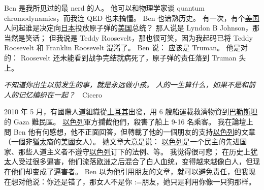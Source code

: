 \documentclass[12pt]{report}
\makeatletter
\newcommand{\cc}[2]{#1}
\newcommand{\cc}[2]{#2}
\newcommand{\tab}{\hspace*{1cm}}
\newcommand{\speechCn}[1]{\textrm{\textit{\textcolor{Speech}{#1}}}}
\renewcommand{\d}[1]{$\underaccent{\scalebox{0.5}{\textbullet}}{\textrm{#1}}$}
\newcommand{\ds}[1]{%
  \@tfor\next:=#1\do{\d{\next}}}
\newcommand*\dashh{\,\,\textemdash\kern-1pt\textemdash\,\,}
\makeatother
\begin{document}
{{}

\cc{
Ben 是我所见过的最 nerd 的人。 他可以和物理学家谈 quantum chromodynamics，而我连 QED 也未搞懂。 Ben 也谙熟历史。  有一次，有个\uline{美国}人问起谁是决定向\uline{日本}投放原子弹的\uline{美国}总统？  那人说是 Lyndon B Johnson，那当然是笑话； 但我说是  Teddy Roosevelt，那也很可笑，因为我起码已将 Teddy Roosevelt 和 Franklin Roosevelt 混淆了。 Ben 说： 应该是 Truman。  他是对的： Roosevelt 还未能看到战争完结就病死了，原子弹的责任落到 Truman 头上。
}{
	
}

\cc{
\speechCn{不知道你出生以前发生的事，就是永远做小孩。 人的一生算什么，如果不是和前人的记忆编织在一起？} \tab \dashh Cicero
}{
	
}

\cc{
2010 年 5 月，有國際人道組織從\uline{土耳其}出發，用 6 艘船運載救濟物資到\uline{巴勒斯坦}的 Gaza 難民區。 \uline{以色列}軍方攔截他們，殺害了船上 9-16 名乘客。 我在論壇上問 Ben 他有何感想，他不正面回答，但轉載了他的一個朋友的支持\uline{以色列}的文章（一個非\uline{猶太}裔的\uline{美國}女人）。 她文章大意是说： \uline{以色列}是一个民主的先进国家、那些人道主义者不遵守\uline{以色列}订下的法例、等。 我觉得很可悲； 在历史上\uline{犹太}人受过很多逼害，他们流落\uline{欧洲}之后混合了白人血统，变得越来越像白人，但现在他们却变成了逼害者。 Ben 以为他引用朋友的文章，就可以避免责任，但我现在想对他说：你还是错了，那女人不是你\ds{朋友}，她只是利用你像一只狗那样。
}{
	
}



}
\end{document}

